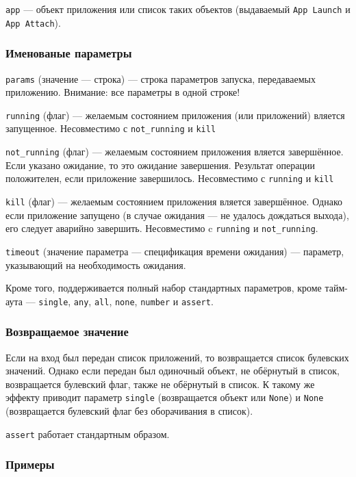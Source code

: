 \documentclass[11pt]{book} %
\begin{document}
\verb"app" --- объект приложения или список таких объектов (выдаваемый \verb"App Launch" и \verb"App Attach").

\subsubsection*{Именованые параметры} 
\verb"params" (значение --- строка) --- строка параметров запуска, передаваемых приложению. Внимание: все параметры в одной строке!

\verb"running" (флаг) --- желаемым состоянием приложения (или приложений) вляется запущенное. Несовместимо с \verb"not_running" и \verb"kill"

\verb"not_running" (флаг) --- желаемым состоянием приложения вляется завершённое. Если указано ожидание, то это ожидание завершения. Результат операции положителен, если приложение завершилось. Несовместимо с \verb"running" и \verb"kill"

\verb"kill" (флаг) --- желаемым состоянием приложения вляется завершённое. Однако если приложение запущено (в случае ожидания --- не удалось дождаться выхода), его следует аварийно завершить. Несовместимо c \verb"running" и \verb"not_running".

\verb"timeout" (значение параметра --- спецификация времени ожидания) --- параметр, указывающий на необходимость ожидания.

Кроме того, поддерживается полный набор стандартных параметров, кроме тайм-аута --- \verb"single", \verb|any|, \verb|all|, \verb|none|, \verb|number| и \verb"assert". 


\subsubsection*{Возвращаемое значение}

Если на вход был передан список приложений, то возвращается список булевских значений. Однако если передан был одиночный объект, не обёрнутый в список, возвращается булевский флаг, также не обёрнутый в список. К такому же эффекту приводит параметр \verb|single| (возвращается объект или \verb|None|) и \verb|None| (возвращается булевский флаг без оборачивания в список).

\verb"assert" работает стандартным образом.

\subsubsection*{Примеры}
\end{document}
